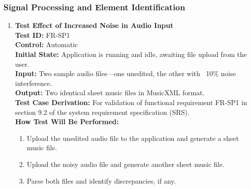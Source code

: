 \documentclass[12pt, titlepage]{article}
\begin{document}
  \subsubsection{Signal Processing and Element Identification}
  \begin{enumerate}
    \item \textbf{Test Effect of Increased Noise in Audio Input} \\
      \newline
      \textbf{Test ID:} FR-SP1 \\
      \textbf{Control:} Automatic \\
      \textbf{Initial State:} Application is running and idle, awaiting file upload from the user. \\
      \textbf{Input:} Two sample audio files—one unedited, the other with ~10\% noise interference. \\
      \textbf{Output:} Two identical sheet music files in MusicXML format. \\
      \textbf{Test Case Derivation:} For validation of functional requirement FR-SP1 in section 9.2 of the system requirement specification (SRS). \\
      \textbf{How Test Will Be Performed:}
      \begin{enumerate}
          \item Upload the unedited audio file to the application and generate a sheet music file.
          \item Upload the noisy audio file and generate another sheet music file.
          \item Parse both files and identify discrepancies, if any.
      \end{enumerate}
    

\end{enumerate}
\end{document}
